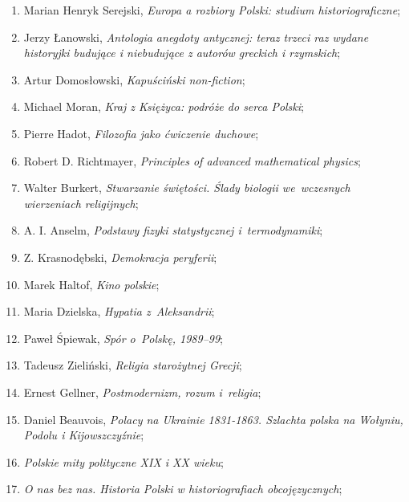 \documentclass[a4paper,11pt]{article}
\begin{document}
\begin{enumerate}
\item Marian Henryk Serejski, \emph{Europa a rozbiory Polski: studium
    historiograficzne};

\item Jerzy Łanowski, \emph{Antologia anegdoty antycznej: teraz trzeci
    raz wydane historyjki budujące i niebudujące z autorów greckich i
    rzymskich};

\item Artur Domosłowski, \emph{Kapuściński non-fiction};

\item Michael Moran, \emph{Kraj z Księżyca: podróże do serca Polski};

\item Pierre Hadot, \emph{Filozofia jako ćwiczenie duchowe};

\item Robert D. Richtmayer, \emph{Principles of advanced mathematical
  physics};

\item Walter Burkert, \emph{Stwarzanie świętości. Ślady biologii
    we~wczesnych wierzeniach religijnych};

\item A. I. Anselm, \emph{Podstawy fizyki statystycznej i~termodynamiki};

\item Z. Krasnodębski, \emph{Demokracja peryferii};

\item Marek Haltof, \emph{Kino polskie};

\item Maria Dzielska, \emph{Hypatia z~Aleksandrii};

\item Paweł Śpiewak, \emph{Spór o~Polskę, 1989--99};

\item Tadeusz Zieliński, \emph{Religia starożytnej Grecji};

\item Ernest Gellner, \emph{Postmodernizm, rozum i~religia};

\item Daniel Beauvois, \emph{Polacy na Ukrainie 1831-1863. Szlachta
    polska na Wołyniu, Podolu i Kijowszczyźnie};

\item \emph{Polskie mity polityczne XIX i XX wieku};

\item \emph{O nas bez nas. Historia Polski w historiografiach
    obcojęzycznych};


\end{enumerate}
\end{document}
